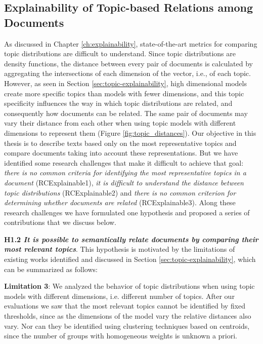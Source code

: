 \subsection{Explainability of Topic-based Relations among Documents}

As discussed in Chapter \ref{ch:explainability}, state-of-the-art metrics for comparing topic distributions are difficult to understand. Since topic distributions are density functions, the distance between every pair of documents is calculated by aggregating the intersections of each dimension of the vector, i.e., of each topic. However, as seen in Section \ref{sec:topic-explainability}, high dimensional models create more specific topics than models with fewer dimensions, and this topic specificity influences the way in which topic distributions are related, and consequently how documents can be related. The same pair of documents may vary their distance from each other when using topic models with different dimensions to represent them (Figure \ref{fig:topic_distances}). Our objective in this thesis is to describe texts based only on the most representative topics and compare documents taking into account these representations. But we have identified some research challenges that make it difficult to achieve that goal: \textit{there is no common criteria for identifying the most representative topics in a document} (RCExplainable1), \textit{it is difficult to understand the distance between topic distributions} (RCExplainable2) and \textit{there is no common criterion for determining whether documents are related} (RCExplainable3). Along these research challenges we have formulated one hypothesis and proposed a series of contributions that we discuss below.

\textbf{H1.2 \textit{It is possible to semantically relate documents by comparing their most relevant topics}}. This hypothesis is motivated by the limitations of existing works identified and discussed in Section \ref{sec:topic-explainability}, which can be summarized as follows:

\textbf{Limitation 3}: We analyzed the behavior of topic distributions when using topic models with different dimensions, i.e. different number of topics. After our evaluations we saw that the most relevant topics cannot be identified by fixed thresholds, since as the dimensions of the model vary the relative distances also vary. Nor can they be identified using clustering techniques based on centroids, since the number of groups with homogeneous weights is unknown a priori.


